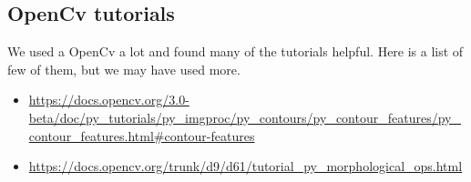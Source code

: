 \documentclass[Report.tex]{subfiles}
\begin{document}
\subsection{OpenCv tutorials}
We used a OpenCv a lot and found many of the tutorials helpful. Here is a list of few of them, but we may have used more.  
\begin{itemize}
    \item \url{https://docs.opencv.org/3.0-beta/doc/py_tutorials/py_imgproc/py_contours/py_contour_features/py_contour_features.html#contour-features}
    \item \url{https://docs.opencv.org/trunk/d9/d61/tutorial_py_morphological_ops.html}
\end{itemize}
\end{document}
